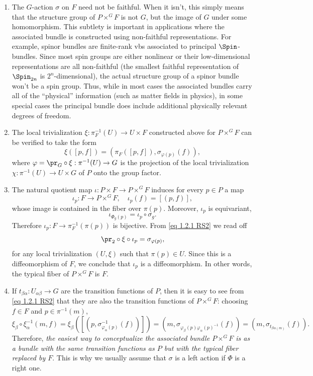 \begin{rem}\label{rem 1.2.3 RS2}
    \begin{enumerate}
        \item The $G$-action $\sigma$ on $F$ need not be faithful. When it isn't, this simply means that the structure group of $P\times^G F$ is not $G$, but the image of $G$ under some homomorphism. This subtlety is important in applications where the associated bundle is constructed using non-faithful representations. For example, spinor bundles are finite-rank \glspl{vb} associated to principal $\Spin$-bundles. Since most spin groups are either nonlinear or their low-dimensional representations are all non-faithful (the smallest faithful representation of $\Spin_{2n}$ is $2^n$-dimensional), the actual structure group of a spinor bundle won't be a spin group. Thus, while in most cases the associated bundles carry all of the ``physical'' information (such as matter fields in physics), in some special cases the principal bundle does include additional physically relevant degrees of freedom.
        \item The local trivialization $\xi:\pi_F^{-1}(U)\to U\times F$ constructed above for $P\times^G F$ can be verified to take the form
        \[\xi([p,f])=(\pi_F([p,f]),\sigma_{\varphi(p)}(f)),\label{eq 1.2.1 RS2}\]
        where $\varphi=\pr_G\circ \xi:\pi^{-1}(U)\to G$ is the projection of the local trivialization $\chi:\pi^{-1}(U)\to U\times G$ of $P$ onto the group factor.
        \item The natural quotient map $\iota:P\times F\to P\times^G F$ induces for every $p\in P$ a map 
        \[\iota_p:F\to P\times^G F,\quad  \iota_p(f)=[(p,f)],\label{eq 1.2.2 RS2 def iotap}\]
        whose image is contained in the fiber over $\pi(p)$.  Moreover, $\iota_p$ is equivariant,
        \[\iota_{\Phi_g(p)}=\iota_p\circ \sigma_g.\label{eq 1.2.3 RS2}\]
        Therefore $\iota_p:F\to \pi_F^{-1}(\pi(p))$ is bijective.  From \eqref{eq 1.2.1 RS2} we read off
        \[\pr_2\circ\xi\circ \iota_p=\sigma_{\varphi(p)},\]
        for any local trivialization $(U,\xi)$ such that $\pi(p)\in U$. Since this is a diffeomorphism of $F$, we conclude that $\iota_p$ is a diffeomorphism. In other words, the typical fiber of $P\times^G F$ is $F$.
        \item If $t_{\beta\alpha}:U_{\alpha\beta}\to G$ are the transition functions of $P$, then it is easy to see from \eqref{eq 1.2.1 RS2} that they are also the transition functions of $P\times^G F$: choosing $f\in F$ and $p\in \pi^{-1}(m)$,
        \[\xi_\beta\circ\xi_{\alpha}^{-1}(m,f)=\xi_\beta([(p,\sigma_{\varphi_\alpha(p)}^{-1}(f))])=(m,\sigma_{\varphi_\beta(p)\varphi_\alpha(p)^{-1}}(f))=(m,\sigma_{t_{\beta\alpha(m)}}(f)).\]
        Therefore, \emph{the easiest way to conceptualize the associated bundle $P\times^G F$ is as a bundle with the same transition functions as $P$ but with the typical fiber replaced by $F$}. This is why we usually assume that $\sigma$ is a left action if $\Phi$ is a right one.
    \end{enumerate}
\end{rem}

